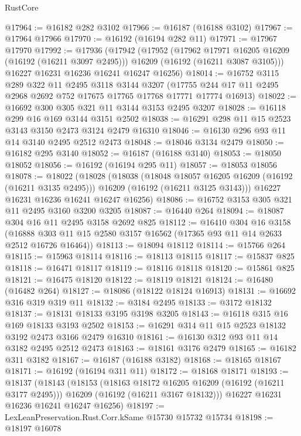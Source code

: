 \begin{lexlean}{RustCore}
\begin{coremodule}
@17964 := @16182 @282 @3102
@17966 := @16187 (@16188 @3102)
@17967 := @17964 @17966
@17970 := @16192 (@16194 @282 @11)
@17971 := @17967 @17970
@17992 := @17936
    (@17942
      (@17952
        (@17962 @17971 @16205 @16209 (@16192 (@16211 @3097 @2495)))
        @16209
        (@16192 (@16211 @3087 @3105)))
      @16227
      @16231
      @16236
      @16241
      @16247
      @16256)
@18014 := @16752
    @3115
    @289
    @322
    @11
    @2495
    @3118
    @3144
    @3207
    (@17755 @244 @17 @11 @2495 @2968 @2692 @752 @17675 @17765 @17768 @17771 @17774 @16913)
@18022 := @16692 @300 @305 @321 @11 @3144 @3153 @2495 @3207
@18028 := @16118 @299 @16 @169 @3144 @3151 @2502
@18038 := @16291 @298 @11 @15 @2523 @3143 @3150 @2473 @3124 @2479 @16310
@18046 := @16130 @296 @93 @11 @14 @3140 @2495 @2512 @2473
@18048 := @18046 @3134 @2479
@18050 := @16182 @295 @3140
@18052 := @16187 (@16188 @3140)
@18053 := @18050 @18052
@18056 := @16192 (@16194 @295 @11)
@18057 := @18053 @18056
@18078 := @18022
    (@18028
      (@18038
        (@18048 @18057 @16205 @16209 (@16192 (@16211 @3135 @2495)))
        @16209
        (@16192 (@16211 @3125 @3143)))
      @16227
      @16231
      @16236
      @16241
      @16247
      @16256)
@18086 := @16752 @3153 @305 @321 @11 @2495 @3160 @3200 @3205
@18087 := @16440 @264
@18094 := @18087 @304 @16 @11 @2495 @3158 @2692 @825
@18112 := @16410
    @304
    @16
    @3158
    (@16888 @303 @11 @15 @2580 @3157 @16562 (@17365 @93 @11 @14 @2633 @2512 @16726 @16464))
@18113 := @18094 @18112
@18114 := @15766 @264
@18115 := @15963 @18114
@18116 := @18113 @18115
@18117 := @15837 @825
@18118 := @16471 @18117
@18119 := @18116 @18118
@18120 := @15861 @825
@18121 := @16475 @18120
@18122 := @18119 @18121
@18124 := @16480 (@16482 @264)
@18127 := @18086 (@18122 @18124 @16913)
@18131 := @16692 @316 @319 @319 @11
@18132 := @3184 @2495
@18133 := @3172 @18132
@18137 := @18131 @18133 @3195 @3198 @3205
@18143 := @16118 @315 @16 @169 @18133 @3193 @2502
@18153 := @16291 @314 @11 @15 @2523 @18132 @3192 @2473 @3166 @2479 @16310
@18161 := @16130 @312 @93 @11 @14 @3182 @2495 @2512 @2473
@18163 := @18161 @3176 @2479
@18165 := @16182 @311 @3182
@18167 := @16187 (@16188 @3182)
@18168 := @18165 @18167
@18171 := @16192 (@16194 @311 @11)
@18172 := @18168 @18171
@18193 := @18137
    (@18143
      (@18153
        (@18163 @18172 @16205 @16209 (@16192 (@16211 @3177 @2495)))
        @16209
        (@16192 (@16211 @3167 @18132)))
      @16227
      @16231
      @16236
      @16241
      @16247
      @16256)
@18197 := LexLeanPreservation.Rust.Corr.kSame @15730 @15732 @15734
@18198 := @18197 @16078

\end{coremodule}
\end{lexlean}
